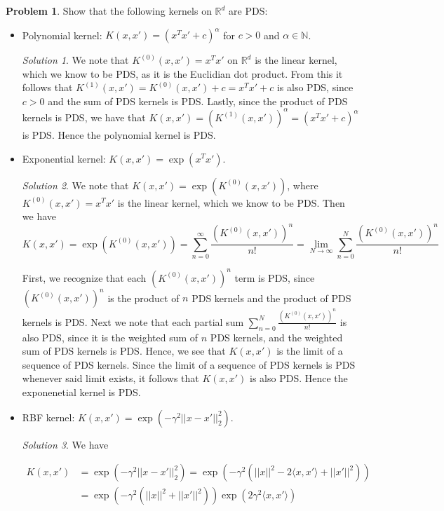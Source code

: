 \documentclass[12pt,a4paper]{article}
\theoremstyle{definition}
\newtheorem{problem}{Problem}
\theoremstyle{remark}
\newtheorem*{solution}{Solution}
\begin{document}
\begin{problem}
    Show that the following kernels on $\mathbb R^d$ are PDS: 
    \begin{itemize}
        \item Polynomial kernel: $K(x,x') = \left( x^T x' + c \right)^\alpha$ for $c>0$ and $\alpha \in \mathbb N$. 
        \begin{solution}
            We note that $K^{(0)}(x,x') = x^Tx'$ on $\mathbb R^d$ is the linear kernel, which we know to be PDS, as it is the Euclidian dot product. From this it follows that $K^{(1)}(x,x') = K^{(0)}(x,x') +c = x^T x' + c$ is also PDS, since $c >0$ and the sum of PDS kernels is PDS. Lastly, since the product of PDS kernels is PDS, we have that $K(x,x') = (K^{(1)}(x,x'))^{\alpha} = \left( x^T x' + c \right)^\alpha$ is PDS. Hence the polynomial kernel is PDS. 
        \end{solution}
        \item Exponential kernel: $K(x,x') = \exp(x^T x')$. 
        \begin{solution}
            We note that $K(x,x') = \exp(K^{(0)}(x,x'))$, where $K^{(0)}(x,x') = x^T x'$ is the linear kernel, which we know to be PDS. Then we have $$K(x,x') = \exp(K^{(0)}(x,x')) = \sum_{n=0}^\infty \frac{\left(K^{(0)}(x,x')\right)^n}{n!} = \lim_{N\rightarrow \infty} \sum_{n=0}^N \frac{\left(K^{(0)}(x,x')\right)^n}{n!}$$

            First, we recognize that each $\left(K^{(0)}(x,x')\right)^n$ term is PDS, since $\left(K^{(0)}(x,x')\right)^n$ is the product of $n$ PDS kernels and the product of PDS kernels is PDS. Next we note that each partial sum $\sum_{n=0}^N \frac{\left(K^{(0)}(x,x')\right)^n}{n!}$ is also PDS, since it is the weighted sum of $n$ PDS kernels, and the weighted sum of PDS kernels is PDS. Hence, we see that $K(x,x')$ is the limit of a sequence of PDS kernels. Since the limit of a sequence of PDS kernels is PDS whenever said limit exists, it follows that $K(x,x')$ is also PDS. Hence the exponenetial kernel is PDS.
        \end{solution}
        \item RBF kernel: $K(x,x') = \exp (-\gamma^2 ||x-x'||_2^2)$.
        \begin{solution}
            We have 

            \begin{align*}
                K(x,x') &= \exp(-\gamma^2 ||x-x'||_2^2) = \exp\left(-\gamma^2(||x||^2 - 2 \langle x, x' \rangle + ||x'||^2)\right) \\
                &= \exp\left(-\gamma^2(||x||^2 + ||x'||^2)\right) \exp \left( 2 \gamma^2 \langle x, x' \rangle \right)
            \end{align*}


\end{solution}
\end{itemize}
\end{problem}
\end{document}
